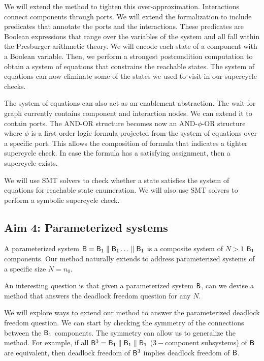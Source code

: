 We will extend the method to tighten this over-approximation. 
Interactions connect components through ports. 
%
We will extend the formalization to include predicates 
that annotate the ports and the interactions. 
These predicates are Boolean expressions that range over the
variables of the system and all fall within 
the Presburger arithmetic theory. 
%
We will encode each state of a component with a Boolean 
variable.
Then, we perform a strongest postcondition computation to 
obtain a system of equations that constrains the reachable 
states.
%
The system of equations can now eliminate some of the states
we used to visit in our supercycle checks. 

The system of equations can also act as an enablement abstraction.
The wait-for graph currently contains component and interaction nodes. 
We can extend it to contain ports. 
The AND-OR structure becomes now an AND-$\phi$-OR structure
where $\phi$ is a first order logic formula projected from
the system of equations over a specific port. 
This allows the composition of formula that indicates
a tighter supercycle check. 
In case the formula has a satisfying assignment, then
a supercycle exists. 

We will use SMT solvers to check whether a state 
satisfies the system of equations for reachable state 
enumeration. 
We will also use SMT solvers to perform a symbolic
supercycle check.

\subsection{Aim 4: Parameterized systems} 

A parameterized system $\mathsf{B}=\mathsf{B}_1 \parallel \mathsf{B}_1 \ldots \parallel \mathsf{B}_1$ is a 
composite system of $N>1$ $\mathsf{B}_1$ components. 
Our method naturally extends to address parameterized systems 
of a specific size $N=n_0$. 

An interesting question \cite{AbdullaHH13VMCAI,ClarkeKV10Memory} 
is that given a parameterized system $\mathsf{B}$, 
can we devise a method that answers the deadlock freedom
question for any $N$. 

We will explore ways to extend our method to answer the 
parameterized deadlock freedom question. 
We can start by checking the symmetry of the connections between
the $\mathsf{B}_1$ components.
The symmetry can allow us to generalize the method. 
For example, if all $\mathsf{B}^3=\mathsf{B}_1\parallel \mathsf{B}_1 \parallel \mathsf{B}_1$ 
($3-$component subsystems) of $\mathsf{B}$ are equivalent,
then deadlock freedom of $\mathsf{B}^3$ implies deadlock freedom 
of $\mathsf{B}$. 



